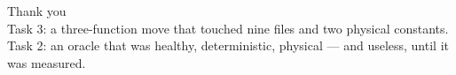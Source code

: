 \documentclass[10pt,aspectratio=169]{beamer}
\begin{document}
\begin{frame}[plain]
\vfill
\centering
{\Large Thank you}\\[1em]
{\small
Task 3: a three-function move that touched nine files and two physical constants.\\
Task 2: an oracle that was healthy, deterministic, physical --- and useless, until it was measured.}
\vfill
\end{frame}
\end{document}
